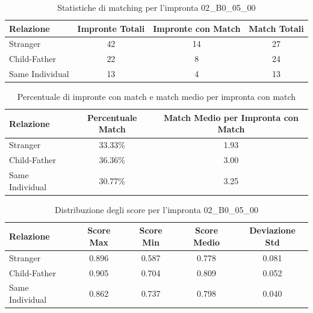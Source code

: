 \begin{table}[htbp]
\centering
\caption{Statistiche di matching per l'impronta 02\_B0\_05\_00}
\label{tab:results_02_B0_05_00}
\begin{tabular}{|l|c|c|c|}
\hline
\textbf{Relazione} & \textbf{Impronte Totali} & \textbf{Impronte con Match} & \textbf{Match Totali} \\
\hline
Stranger & 42 & 14 & 27 \\
\hline
Child-Father & 22 & 8 & 24 \\
\hline
Same Individual & 13 & 4 & 13 \\
\hline
\end{tabular}
\end{table}


\begin{table}[htbp]
\centering
\caption{Percentuale di impronte con match e match medio per impronta con match}
\label{tab:match_percentage_02_B0_05_00}
\begin{tabular}{|l|c|c|}
\hline
\textbf{Relazione} & \textbf{Percentuale Match} & \textbf{Match Medio per Impronta con Match} \\
\hline
Stranger & 33.33\% & 1.93 \\
\hline
Child-Father & 36.36\% & 3.00 \\
\hline
Same Individual & 30.77\% & 3.25 \\
\hline
\end{tabular}
\end{table}


\begin{table}[htbp]
\centering
\caption{Distribuzione degli score per l'impronta 02\_B0\_05\_00}
\label{tab:scores_02_B0_05_00}
\begin{tabular}{|l|c|c|c|c|}
\hline
\textbf{Relazione} & \textbf{Score Max} & \textbf{Score Min} & \textbf{Score Medio} & \textbf{Deviazione Std} \\
\hline
Stranger & 0.896 & 0.587 & 0.778 & 0.081 \\
\hline
Child-Father & 0.905 & 0.704 & 0.809 & 0.052 \\
\hline
Same Individual & 0.862 & 0.737 & 0.798 & 0.040 \\
\hline
\end{tabular}
\end{table}

